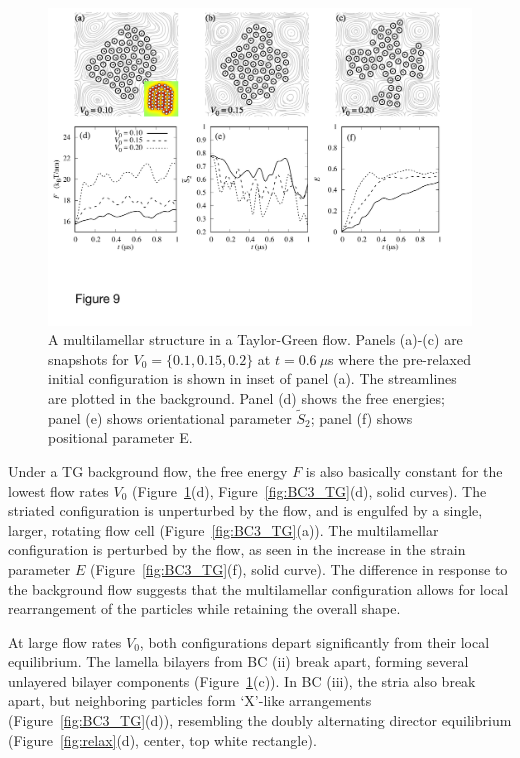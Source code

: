 \documentclass[prb,preprint,showpacs,preprintnumbers,amsmath,amssymb,longbibliography]{revtex4-1}
\begin{document}
\begin{figure}
  \begin{center}
\includegraphics[width=1.0\textwidth]{Figures/Figure9.pdf} 
  \end{center}
  \vspace{-20pt}
  \caption{\label{fig:BC2_TG} A multilamellar structure in a
  Taylor-Green flow. Panels (a)-(c) are snapshots for $V_0 = \{0.1,
  0.15, 0.2\}$ at $t=0.6\ \mu$s where the pre-relaxed initial
  configuration is shown in inset of panel (a). The streamlines are
  plotted in the background. Panel (d) shows the free energies; panel
  (e) shows orientational parameter $\tilde{S}_2$; panel (f) shows
  positional parameter E.}
\end{figure}


Under a TG background flow, the free energy $F$ is also basically
constant for the lowest flow rates $V_0$ (Figure~\ref{fig:BC2_TG}(d),
Figure~\ref{fig:BC3_TG}(d), solid curves). The striated configuration is
unperturbed by the flow, and is engulfed by a single, larger, rotating
flow cell (Figure~\ref{fig:BC3_TG}(a)). The multilamellar configuration
is perturbed by the flow, as seen in the increase in the strain
parameter $E$ (Figure~\ref{fig:BC3_TG}(f), solid curve). The difference
in response to the background flow suggests that the multilamellar
configuration allows for local rearrangement of the particles while
retaining the overall shape.

At large flow rates $V_0$, both configurations depart significantly from
their local equilibrium. The lamella bilayers from BC (ii) break apart,
forming several unlayered bilayer components
(Figure~\ref{fig:BC2_TG}(c)). In BC (iii), the stria also break apart,
but neighboring particles form `X'-like arrangements
(Figure~\ref{fig:BC3_TG}(d)), resembling the doubly alternating director
equilibrium (Figure~\ref{fig:relax}(d), center, top white rectangle).
\end{document}
